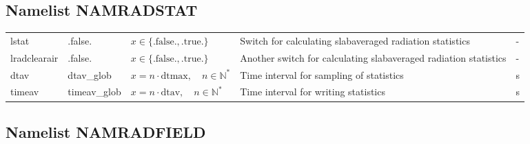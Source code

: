 \documentclass[twoside,11pt,fleqn,a4paper,english,openright]{report}
\begin{document}
\subsection{Namelist NAMRADSTAT}\label{par:radstat}
\begin{center}
  \tablelasttail{
        &&&&\\\hline
  }
\begin{supertabular}{|l|p{2cm}|p{4cm}|p{6cm}|l|}
  lstat	& .false.	& $x\in\{\text{.false.},\text{.true.}\}$	& Switch for calculating slabaveraged radiation statistics	& -\\
  lradclearair	& .false.	& $x\in\{\text{.false.},\text{.true.}\}$	& Another switch for calculating slabaveraged radiation statistics	& -\\
  dtav		& dtav\_glob	& $x = n \cdot \text{dtmax}, \quad n \in \mathbb{N}^*$	& Time interval for sampling of statistics	& s\\
  timeav	& timeav\_glob	& $x = n \cdot \text{dtav}, \quad n \in \mathbb{N}^*$	& Time interval for writing statistics		& s\\
\end{supertabular}
\end{center}


\subsection{Namelist NAMRADFIELD}\label{par:radfield}
\end{document}
